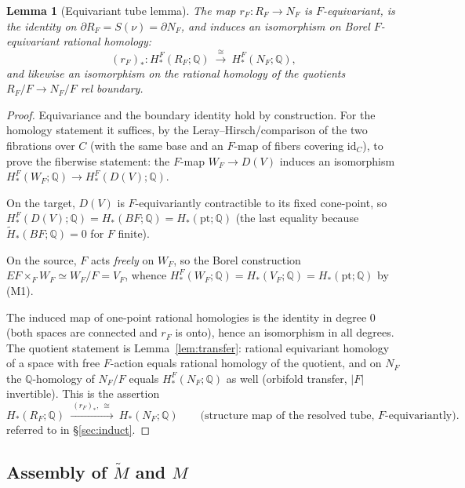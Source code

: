 \documentclass[12pt]{article}
\newtheorem{lemma}[theorem]{Lemma}
\theoremstyle{definition}
\begin{document}
\begin{lemma}[Equivariant tube lemma]\label{lem:tube}
The map $r_F\colon R_F\to N_F$ is $F$-equivariant, is the identity on
$\partial R_F=S(\nu)=\partial N_F$, and induces an isomorphism on Borel
$F$-equivariant rational homology:
\[
   (r_F)_*\colon H^F_*(R_F;\mathbb{Q})\ \xrightarrow{\ \cong\ }\
   H^F_*(N_F;\mathbb{Q}),
\]
and likewise an isomorphism on the rational homology of the quotients
$R_F/F\to N_F/F$ rel boundary.
\end{lemma}
\begin{proof}
Equivariance and the boundary identity hold by construction. For the homology
statement it suffices, by the Leray--Hirsch/comparison of the two fibrations
over $C$ (with the same base and an $F$-map of fibers covering $\mathrm{id}_C$),
to prove the fiberwise statement: the $F$-map $W_F\to D(V)$ induces an
isomorphism $H^F_*(W_F;\mathbb{Q})\to H^F_*(D(V);\mathbb{Q})$.

On the target, $D(V)$ is $F$-equivariantly contractible to its fixed cone-point,
so $H^F_*(D(V);\mathbb{Q})=H_*(BF;\mathbb{Q})=H_*(\mathrm{pt};\mathbb{Q})$
(the last equality because $\widetilde H_*(BF;\mathbb{Q})=0$ for $F$ finite).

On the source, $F$ acts \emph{freely} on $W_F$, so the Borel construction
$EF\times_F W_F\simeq W_F/F=V_F$, whence
$H^F_*(W_F;\mathbb{Q})=H_*(V_F;\mathbb{Q})=H_*(\mathrm{pt};\mathbb{Q})$ by (M1).

The induced map of one-point rational homologies is the identity in degree $0$
(both spaces are connected and $r_F$ is onto), hence an isomorphism in all
degrees. The quotient statement is Lemma~\ref{lem:transfer}: rational equivariant
homology of a space with free $F$-action equals rational homology of the
quotient, and on $N_F$ the $\mathbb{Q}$-homology of $N_F/F$ equals
$H^F_*(N_F;\mathbb{Q})$ as well (orbifold transfer, $|F|$ invertible). This is
the assertion
\begin{equation}\label{eq:RFNF}
H_*(R_F;\mathbb{Q})\ \xrightarrow{\ (r_F)_*,\ \cong\ }\ H_*(N_F;\mathbb{Q})
\qquad\text{(structure map of the resolved tube, $F$-equivariantly).}
\end{equation}
referred to in \S\ref{sec:induct}.
\end{proof}

\subsection{Assembly of $\widetilde M$ and $M$}
\end{document}
